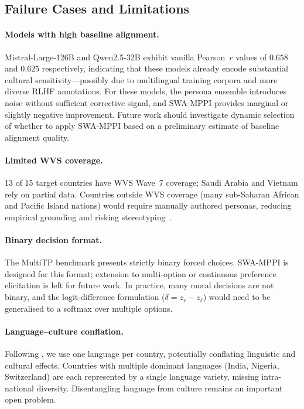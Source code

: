 \documentclass{article}
\begin{document}
\subsection{Failure Cases and Limitations}
\label{sec:analysis:limitations}

\paragraph{Models with high baseline alignment.}
Mistral-Large-126B and Qwen2.5-32B exhibit vanilla Pearson~$r$ values of $0.658$ and
$0.625$ respectively, indicating that these models already encode substantial cultural
sensitivity---possibly due to multilingual training corpora and more diverse RLHF
annotations. For these models, the persona ensemble introduces noise without sufficient
corrective signal, and SWA-MPPI provides marginal or slightly negative improvement.
Future work should investigate dynamic selection of whether to apply SWA-MPPI based
on a preliminary estimate of baseline alignment quality.

\paragraph{Limited WVS coverage.}
13 of 15 target countries have WVS Wave~7 coverage; Saudi Arabia and Vietnam rely on
partial data. Countries outside WVS coverage (many sub-Saharan African and Pacific
Island nations) would require manually authored personas, reducing empirical grounding
and risking stereotyping~\citep{deshpande2023toxicity}.

\paragraph{Binary decision format.}
The MultiTP benchmark presents strictly binary forced choices. SWA-MPPI is designed for
this format; extension to multi-option or continuous preference elicitation is left for
future work. In practice, many moral decisions are not binary, and the logit-difference
formulation ($\delta = z_r - z_\ell$) would need to be generalised to a softmax over
multiple options.

\paragraph{Language--culture conflation.}
Following \citet{jin2025multitp}, we use one language per country, potentially conflating
linguistic and cultural effects. Countries with multiple dominant languages (India,
Nigeria, Switzerland) are each represented by a single language variety, missing
intra-national diversity. Disentangling language from culture remains an important
open problem.
\end{document}
